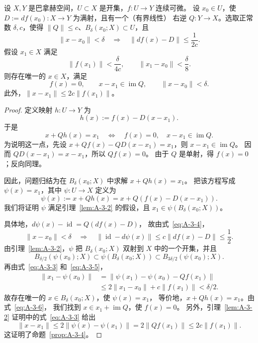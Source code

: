 \begin{proposition}\label{prop:A-3-4}
设 $X,Y$ 是巴拿赫空间，$U\subset X$ 是开集，$f:U\to Y$ 连续可微。
设 $x_0\in U$，使 $D:=df(x_0):X\to Y$ 为满射，且有一个（有界线性）
右逆 $Q:Y\to X$。选取正常数 $\delta,c$，使得
$\|Q\|\le c$、$B_\delta(x_0;X)\subset U$，且
\begin{equation}\label{eq:A-3-4}
  \|x-x_0\|<\delta
  \quad\Longrightarrow\quad
  \|df(x)-D\|\le\frac1{2c}.
\end{equation}
假设 $x_1\in X$ 满足
\begin{equation}\label{eq:A-3-5}
  \|f(x_1)\|<\frac\delta{4c},
  \qquad \|x_1-x_0\|<\frac\delta8.
\end{equation}
则存在唯一的 $x\in X$，满足
\[
  f(x)=0,\qquad x-x_1\in\operatorname{im}Q,
  \qquad \|x-x_0\|<\delta.
\]
此外，$\|x-x_1\|\le2c\|f(x_1)\|$。
\end{proposition}

\begin{proof}
定义映射 $h:U\to Y$ 为
\[
  h(x):=f(x)-D(x-x_1).
\]
于是
\begin{equation}\label{eq:A-3-6}
  x+Qh(x)=x_1
  \quad\Longleftrightarrow\quad
  f(x)=0,\quad x-x_1\in\operatorname{im}Q.
\end{equation}
为说明这一点，先设
$x+Qf(x)-QD(x-x_1)=x_1$，则 $x-x_1\in\operatorname{im}Q$。
因而 $QD(x-x_1)=x-x_1$，所以 $Qf(x)=0$。
由于 $Q$ 是单射，得 $f(x)=0$；反向同理。

因此，问题归结为在 $B_\delta(x_0;X)$ 中求解 $x+Qh(x)=x_1$。
把该方程写成 $\psi(x)=x_1$，其中 $\psi:U\to X$ 定义为
\[
  \psi(x):=x+Qh(x)=x+Q(f(x)-D(x-x_1)).
\]
我们将证明 $\psi$ 满足引理~\ref{lem:A-3-2} 的假设，且
$x_1\in\psi(B_\delta(x_0;X))$。

具体地，$d\psi(x)-\operatorname{id}=Q(df(x)-D)$，
故由式~\eqref{eq:A-3-4}，
\[
  \|x-x_0\|<\delta
  \quad\Longrightarrow\quad
  \|\operatorname{id}-d\psi(x)\|
  \le c\|df(x)-D\|\le\frac12.
\]
由引理~\ref{lem:A-3-2}，$\psi$ 把 $B_\delta(x_0;X)$
双射到 $X$ 中的一个开集，并且
\[
  B_{\delta/2}(\psi(x_0);X)
  \subset\psi(B_\delta(x_0;X))
  \subset B_{3\delta/2}(\psi(x_0);X).
\]
再由式~\eqref{eq:A-3-3} 和~\eqref{eq:A-3-5}，
\[
\begin{aligned}
  \|x_1-\psi(x_0)\|
  &=\|\psi(x_1)-\psi(x_0)-Qf(x_1)\|\\
  &\le2\|x_1-x_0\|+c\|f(x_1)\|<\delta/2.
\end{aligned}
\]
故存在唯一的 $x\in B_\delta(x_0;X)$，使 $\psi(x)=x_1$，
等价地，$x+Qh(x)=x_1$。由式~\eqref{eq:A-3-6}，
我们找到 $x\in x_1+\operatorname{im}Q$，使 $f(x)=0$。
另外，引理~\ref{lem:A-3-2} 证明中的式~\eqref{eq:A-3-3} 给出
\[
  \|x-x_1\|
  \le2\|\psi(x)-\psi(x_1)\|
  =2\|Qf(x_1)\|
  \le2c\|f(x_1)\|.
\]
这证明了命题~\ref{prop:A-3-4}。
\end{proof}

